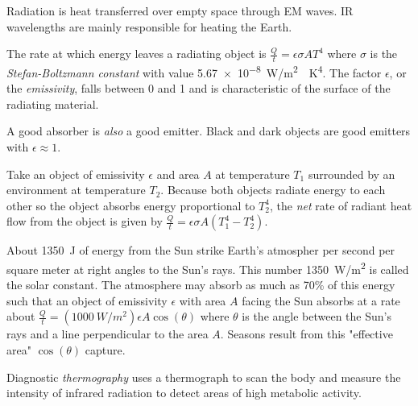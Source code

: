 \begin{definition}[Radiation]
    Radiation is heat transferred over empty space through EM waves. IR wavelengths are mainly responsible for heating the Earth.
\end{definition}
\begin{definition}
    The rate at which energy leaves a radiating object is $\frac{Q}{t} = \epsilon\sigma AT^4$ where $\sigma$ is the \emph{Stefan-Boltzmann constant} with value \qty{5.67e-8}{W/m^2\cdot K^4}. The factor $\epsilon$, or the \emph{emissivity}, falls between 0 and 1 and is characteristic of the surface of the radiating material.
\end{definition}
\begin{remark}
    A good absorber is \emph{also} a good emitter. Black and dark objects are good emitters with $\epsilon\approx1.$
\end{remark}
\begin{example}
    Take an object of emissivity $\epsilon$ and area $A$ at temperature $T_1$ surrounded by an environment at temperature $T_2$. Because both objects radiate energy to each other so the object absorbs energy proportional to $T^4_2$, the \emph{net} rate of radiant heat flow from the object is given by $\frac{Q}{t} = \epsilon\sigma A(T_1^4-T_2^4).$
\end{example}
\begin{definition}
    About \qty{1350}{J} of energy from the Sun strike Earth's atmospher per second per square meter at right angles to the Sun's rays. This number \qty{1350}{W/m^2} is called the solar constant. The atmosphere may absorb as much as 70\% of this energy such that an object of emissivity $\epsilon$ with area $A$ facing the Sun absorbs at a rate about $\frac{Q}{t} = (\qty{1000}{W/m^2})\epsilon A\cos(\theta)$ where $\theta$ is the angle between the Sun's rays and a line perpendicular to the area $A$. Seasons result from this "effective area" $\cos(\theta)$ capture.
\end{definition}
\begin{definition}[Thermography]
    Diagnostic \emph{thermography} uses a thermograph to scan the body and measure the intensity of infrared radiation to detect areas of high metabolic activity.
\end{definition}
